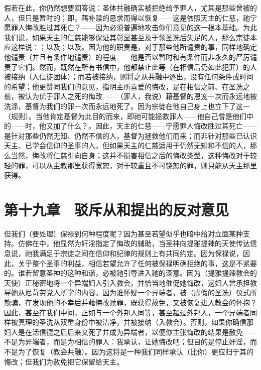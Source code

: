 假若在此，你仍然想要回答说：圣体共融确实被拒绝给予罪人，尤其是那些曾被的人，但只是暂时的；即，藉补赎的恳求而得以恢复——这是依照天主的仁慈，祂宁愿罪人悔改胜过其死亡？——因为必须普遍地攻击你们意见的这一根本基础。为此我们说，如果天主的仁慈能够保证其彰显甚至及于领圣洗后失足的人，那么宗徒本应这样说：；以及；以及。因为他的职责是，对于那些他所谴责的事，同样地确定他谴责（并且有条件地谴责）的程度——他是否以暂时和有条件而非永久的严厉谴责了它们。然而，既然在所有书信中，他都禁止此等（在相信后仍如此犯罪）的人被接纳（入信徒团体）；而若被接纳，则将之从共融中逐出，没有任何条件或时间的希望；他更赞同我们的意见，指明主所喜爱的悔改，是在相信之前、在圣洗之前，被认为优于罪人之死的悔改——（罪人，我说）藉基督的恩宠一次而永远地被洗涤，基督为我们的罪一次而永远地死了。因为宗徒在他自己身上也立下了这一（规则）。当他肯定基督为此目的而来，即祂可能拯救罪人——他自己曾是他们中的——时，他又加了什么？。因此，天主的仁慈——宁愿罪人悔改胜过其死亡——是针对那些仍然无知、仍然不信的人，基督为拯救他们而来；而非针对那些已认识天主、已学会信仰的圣事的人。但如果天主的仁慈适用于仍然无知和不信的人，那么当然，悔改将仁慈引向自身；这并不损害相信之后的悔改类型，这种悔改对于较轻的罪，可以从主教那里获得宽恕，对于较重且不可饶恕的罪，则只能从天主那里获得。\par


\section{第十九章　驳斥从和提出的反对意见}

但我们（要处理）保禄到何种程度呢？因为甚至若望似乎也暗中给对立面某种支持。仿佛在中，他显然为奸淫指定了悔改的辅助，当圣神向提雅提辣的天使传达信息说，祂我满足于宗徒之间在信仰和纪律的规则上有共同约定。因为保禄说，因此，关乎整个圣事的利益，相信若望允许了任何被保禄明确拒绝的事，这是不紧要的。谁若留意圣神的这种和谐，必被祂引导进入祂的深意。因为（提雅提辣教会的天使）正秘密地将一个异端妇人引入教会，并恰当地催促她悔改，这妇人曾承担教导她从尼苛劳党人所学的内容。因为谁怀疑一个异端者，被（虚假的圣洗）仪式所欺骗，在发现他的不幸后并藉悔改赎罪，既获得赦免，又被恢复进入教会的怀抱？因此，甚至在我们中间，正如与一个外邦人同等，甚至超过外邦人，一个异端者同样被真理的圣洗从双重身份中被洁净，并被接纳（入教会）。否则，如果你确信那妇人是在活信德之后后来又死了并成为异端者，以便你主张悔改的结果是赦免——不是为异端者，而是为相信的罪人：我承认，让她悔改吧；但目的是停止奸淫，而不是为了恢复（教会共融）。因为这将是一种我们同样承认（比你）更应归于其的悔改；但我们为赦免把它保留给天主。\par

